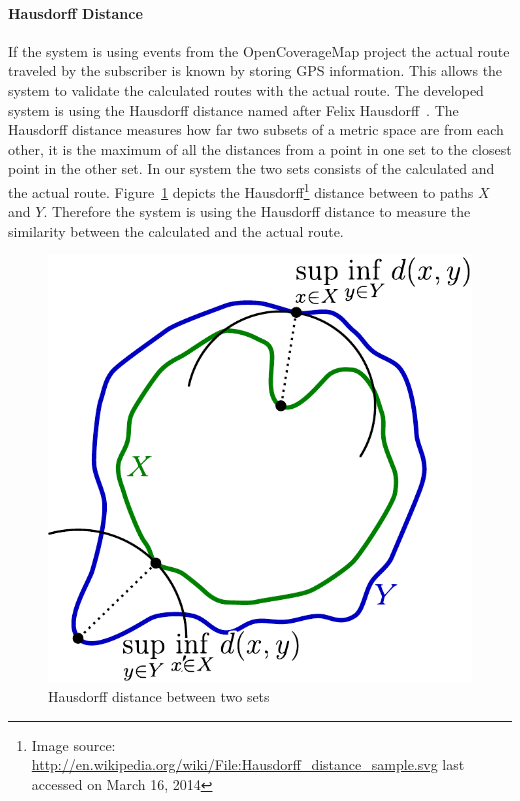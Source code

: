 \paragraph{Hausdorff Distance}
If the system is using events from the OpenCoverageMap project the actual route traveled by the subscriber is known by storing GPS information. This allows the system to validate the calculated routes with the actual route. The developed system is using the Hausdorff distance named after Felix Hausdorff~\cite{Rockafellar1998}. The Hausdorff distance measures how far two subsets of a metric space are from each other, it is the maximum of all the distances from a point in one set to the closest point in the other set. In our system the two sets consists of the calculated and the actual route. Figure~\ref{fig:Hausdorff_distance_sample} depicts the Hausdorff\footnote{Image source: \url{http://en.wikipedia.org/wiki/File:Hausdorff_distance_sample.svg} last accessed on March 16, 2014 } distance between to paths $X$ and $Y$. Therefore the system is using the Hausdorff distance to measure the similarity between the calculated and the actual route.
\begin{figure}
	\centering
	\includegraphics[width=0.7\linewidth]{./images/Hausdorff_distance_sample}
	\caption{Hausdorff distance between two sets}
	\label{fig:Hausdorff_distance_sample}
\end{figure}


